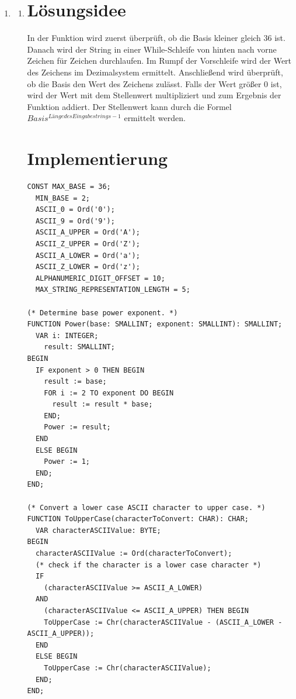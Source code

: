 \documentclass[a4paper]{article}
\begin{document}
	\begin{enumerate}
		\item
		\begin{enumerate}
			\item
			\section*{Lösungsidee}
			
			In der Funktion wird zuerst überprüft, ob die Basis kleiner gleich 36 ist. Danach wird der String in einer While-Schleife von hinten nach vorne Zeichen für Zeichen durchlaufen.
			\newline
			Im Rumpf der Vorschleife wird der Wert des Zeichens im Dezimalsystem ermittelt. Anschließend wird überprüft, ob die Basis den Wert des Zeichens zulässt. Falls der Wert größer 0 ist, wird der Wert mit dem Stellenwert multipliziert und zum Ergebnis der Funktion addiert. Der Stellenwert kann durch die Formel $ Basis^{Länge des Eingabestrings - 1} $ ermittelt werden.
			
			\section*{Implementierung}
			\begin{lstlisting}[label=scValueOf_a, resetmargins=true]
CONST MAX_BASE = 36;
  MIN_BASE = 2;
  ASCII_0 = Ord('0');
  ASCII_9 = Ord('9');
  ASCII_A_UPPER = Ord('A');
  ASCII_Z_UPPER = Ord('Z');
  ASCII_A_LOWER = Ord('a');
  ASCII_Z_LOWER = Ord('z');
  ALPHANUMERIC_DIGIT_OFFSET = 10;
  MAX_STRING_REPRESENTATION_LENGTH = 5;

(* Determine base power exponent. *)
FUNCTION Power(base: SMALLINT; exponent: SMALLINT): SMALLINT;
  VAR i: INTEGER;
    result: SMALLINT;
BEGIN
  IF exponent > 0 THEN BEGIN
    result := base;
    FOR i := 2 TO exponent DO BEGIN
      result := result * base;
    END;
    Power := result;
  END
  ELSE BEGIN
    Power := 1;
  END;
END;

(* Convert a lower case ASCII character to upper case. *)
FUNCTION ToUpperCase(characterToConvert: CHAR): CHAR;
  VAR characterASCIIValue: BYTE;
BEGIN
  characterASCIIValue := Ord(characterToConvert);
  (* check if the character is a lower case character *)
  IF
    (characterASCIIValue >= ASCII_A_LOWER)
  AND
    (characterASCIIValue <= ASCII_A_UPPER) THEN BEGIN
    ToUpperCase := Chr(characterASCIIValue - (ASCII_A_LOWER - ASCII_A_UPPER));
  END
  ELSE BEGIN
    ToUpperCase := Chr(characterASCIIValue);
  END;
END;


\end{lstlisting}
\end{enumerate}
\end{enumerate}
\end{document}
